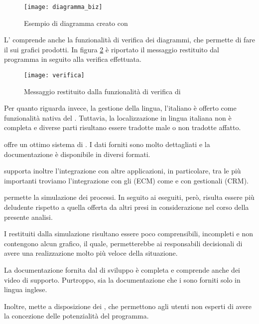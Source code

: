 \begin{figure}[H]
  \centering
  \texttt{[image: diagramma\_biz]}
  \caption{Esempio di diagramma creato con  }
  \label{fig:diagramma_biz}
\end{figure}

L' comprende anche la funzionalità di verifica dei diagrammi, che permette di fare il   sui grafici prodotti. In figura \ref{fig:verifica} è riportato il messaggio restituito dal programma in seguito alla verifica effettuata.

\begin{figure}[H]
  \centering
  \texttt{[image: verifica]}
  \caption{Messaggio restituito dalla funzionalità di verifica di }
  \label{fig:verifica}
\end{figure}

Per quanto riguarda invece, la gestione della lingua, l'italiano è offerto come funzionalità nativa del \sw \progname. Tuttavia, la localizzazione in lingua italiana non è completa e diverse parti risultano essere tradotte male o non tradotte affatto.

\progname offre un ottimo sistema di . I dati forniti sono molto dettagliati e la documentazione è disponibile in diversi formati.

\progname supporta inoltre l'integrazione con altre applicazioni, in particolare, tra le più importanti troviamo l'integrazione con gli  (ECM) come  e con gestionali  (CRM).

\progname permette la simulazione dei processi. In seguito ai  eseguiti, però, risulta essere più deludente rispetto a quella offerta da altri \sw presi in considerazione nel corso della presente analisi.

I  restituiti dalla simulazione risultano essere poco comprensibili, incompleti e non contengono alcun grafico, il quale, permetterebbe ai responsabili decisionali di avere una realizzazione molto più veloce della situazione.
 
La documentazione fornita dal  di sviluppo è completa e comprende anche dei video  di supporto. Purtroppo, sia la documentazione che i  sono forniti solo in lingua inglese.

Inoltre, \progname mette a disposizione dei , che permettono agli utenti non esperti di avere la concezione delle potenzialità del programma.

